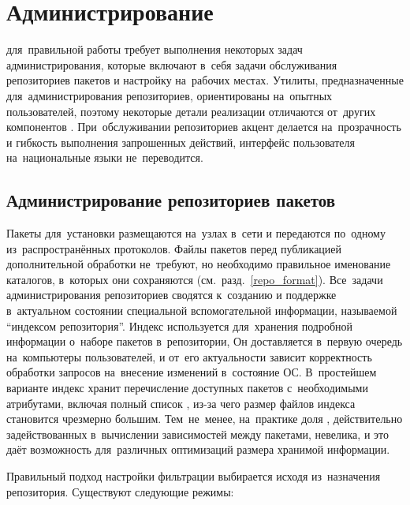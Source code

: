 
\section{Администрирование \ds}

\ds для~правильной работы требует выполнения некоторых задач администрирования,
которые включают в~себя задачи обслуживания репозиториев пакетов 
и настройку \ds на~рабочих местах.
Утилиты, предназначенные для~администрирования репозиториев, ориентированы на~опытных пользователей,
поэтому некоторые детали реализации отличаются от~других компонентов \ds.
При~обслуживании репозиториев акцент делается на~прозрачность и гибкость выполнения запрошенных действий,
интерфейс пользователя на~национальные языки не~переводится.

\subsection{Администрирование репозиториев пакетов}

Пакеты для~установки размещаются на~узлах в~сети и передаются по~одному из~распространённых протоколов.
Файлы пакетов перед публикацией дополнительной обработки не~требуют,
но необходимо правильное именование каталогов, в~которых они сохраняются (см.~разд.~\ref{repo_format}).
Все~задачи администрирования репозиториев сводятся к~созданию и поддержке в~актуальном состоянии специальной вспомогательной информации,
называемой ``индексом  репозитория''.
Индекс используется для~хранения подробной информации о~наборе пакетов в~репозитории, 
Он доставляется  в~первую очередь  на~компьютеры пользователей,
и от~его актуальности зависит корректность обработки запросов на~внесение изменений в~состояние ОС.
В~простейшем варианте индекс хранит перечисление доступных пакетов с~необходимыми атрибутами,
включая полный список \provides, из-за чего размер файлов индекса становится чрезмерно большим.
Тем~не~менее, на~практике доля \provides, действительно задействованных в~вычислении зависимостей между пакетами, невелика,
и это даёт возможность для~различных оптимизаций размера хранимой информации.

Правильный подход настройки фильтрации \provides выбирается исходя из~назначения репозитория.
Существуют следующие режимы:

